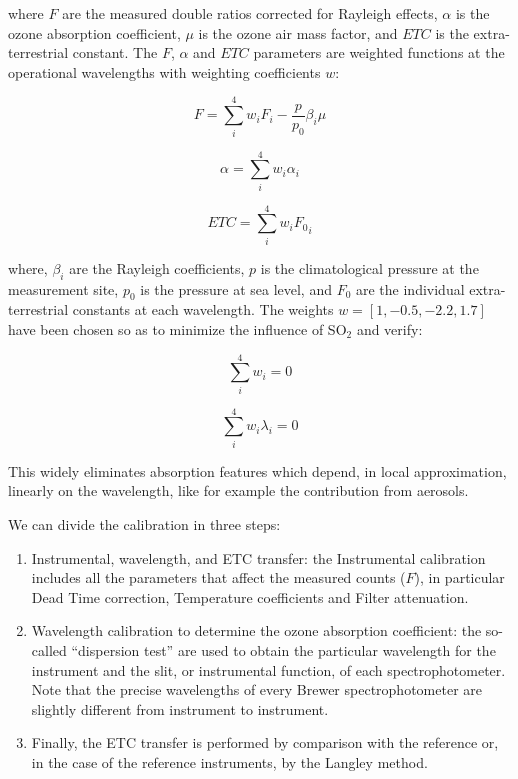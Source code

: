\documentclass[acp]{copernicus} %
\begin{document}
where $F$ are the measured double ratios corrected for Rayleigh effects, $\alpha$ is the ozone absorption coefficient, $\mu$ is the ozone air mass factor, and $ETC$ is the extra-terrestrial constant. The $F$, $\alpha$ and $ETC$ parameters are weighted functions at the operational wavelengths with weighting coefficients $w$:
      
\begin{equation}	
	F = \sum\limits_i^4 {{w_i} {F_i} - \frac{p} {p_0} \beta_i \mu }
\end{equation}
      
\begin{equation}	
	\alpha = \sum\limits_i^4 {{w_i} {\alpha_i} }
\end{equation}

\begin{equation}	
	ETC = \sum\limits_i^4 {{w_i} {{F_0}_i} }
\end{equation}

where, $\beta_i$ are the Rayleigh coefficients,  $p$ is the climatological pressure at the measurement site, $p_0$ is the pressure at sea level, and $F_0$ are the individual extra-terrestrial constants at each wavelength. The weights $w=[1,-0.5,-2.2, 1.7]$ have been chosen so as to minimize the influence of SO$_2$ and verify:
      
\begin{equation}	
	\sum\limits_i^4 {{w_i} }=0
\end{equation}
     
\begin{equation}	
	\sum\limits_i^4 {{w_i} {{\lambda}_i} }=0
\end{equation}

This widely eliminates absorption features which depend, in local approximation, linearly on the wavelength, like for example the contribution from aerosols.

We can divide the calibration in three steps:

\begin{enumerate}
	\item Instrumental, wavelength, and ETC transfer: the Instrumental calibration includes all the parameters that affect the measured counts ($F$), in particular Dead Time correction, Temperature coefficients and  Filter attenuation.
	\item Wavelength calibration to determine the ozone absorption coefficient: the so-called ``dispersion test'' are used to obtain the particular wavelength for the instrument and the slit, or instrumental function, of each spectrophotometer. Note that the precise wavelengths of every Brewer spectrophotometer are slightly different from instrument to instrument. 
	\item Finally, the ETC transfer is performed by comparison with the reference or, in the case of the reference instruments, by the Langley method.
\end{enumerate}
\end{document}
